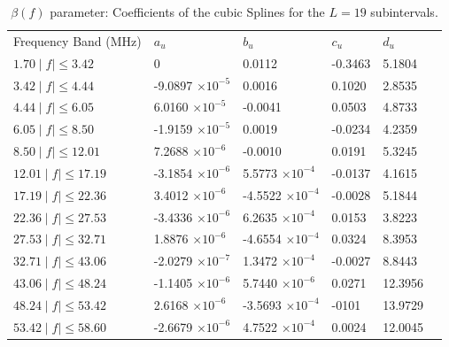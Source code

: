 \documentclass[journal]{IEEEtran}
\begin{document}
\begin{table}[h!]
	\setlength\extrarowheight{4.5pt}
	\centering
	\caption{$\beta(f)$ parameter: Coefficients of the cubic Splines for the $L=19$ subintervals.}
	\label{table_beta}
	\begin{tabular}{|C{3.5cm}|C{2.5cm}|C{2.5cm}|C{2.5cm}|C{2.5cm}|m{0cm}}
		Frequency Band (MHz)           		   & $a_u$    			   & $b_u$      			  & $c_u$   		 		& $d_u$ &\\ 
		$1.70 \mid f\mid \leq 3.42$   & 0 						   & 0.0112 				  & -0.3463 				& 5.1804  &\\ 
		$3.42 \mid f\mid \leq 4.44$   & -9.0897 $\times 10^{-5}$  & 0.0016 				  & 0.1020  				& 2.8535  &\\ 
		$4.44 \mid f\mid \leq 6.05$   & 6.0160  $\times 10^{-5}$  & -0.0041 				  & 0.0503 					& 4.8733  &\\ 
		$6.05 \mid f\mid \leq 8.50$   & -1.9159 $\times 10^{-5}$  & 0.0019 				  & -0.0234 				& 4.2359  &\\ 
		$8.50 \mid f\mid \leq 12.01$  & 7.2688  $\times 10^{-6}$  & -0.0010 				  & 0.0191 					& 5.3245  &\\ 
		$12.01 \mid f\mid \leq 17.19$ & -3.1854 $\times 10^{-6}$  & 5.5773 $\times 10^{-4}$  & -0.0137 				& 4.1615  &\\ 
		$17.19 \mid f\mid \leq 22.36$ & 3.4012 $\times 10^{-6}$   & -4.5522 $\times 10^{-4}$ & -0.0028  				& 5.1844  &\\ 
		$22.36 \mid f\mid \leq 27.53$ & -3.4336 $\times 10^{-6}$  & 6.2635 $\times 10^{-4}$  & 0.0153 					& 3.8223  &\\ 
		$27.53 \mid f\mid \leq 32.71$ & 1.8876  $\times 10^{-6}$  & -4.6554 $\times 10^{-4}$ & 0.0324 					& 8.3953  &\\ 
		$32.71 \mid f\mid \leq 43.06$ & -2.0279 $\times 10^{-7}$  & 1.3472 $\times 10^{-4}$  & -0.0027 				& 8.8443  &\\ 
		$43.06 \mid f\mid \leq 48.24$ & -1.1405  $\times 10^{-6}$ & 5.7440 $\times 10^{-6}$  & 0.0271  				& 12.3956 &\\ 
		$48.24 \mid f\mid \leq 53.42$ & 2.6168  $\times 10^{-6}$  & -3.5693 $\times 10^{-4}$ & -0101 					& 13.9729 &\\ 
		$53.42 \mid f\mid \leq 58.60$ & -2.6679 $\times 10^{-6}$  & 4.7522 $\times 10^{-4}$  & 0.0024 					& 12.0045 &\\ 

\end{tabular}
\end{table}
\end{document}
